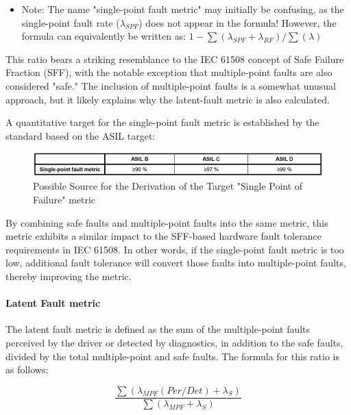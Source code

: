 \documentclass[./dissertation.tex]{subfiles}
\begin{document}
\begin{itemize}
\item Note: The name "single-point fault metric" may initially be confusing, as the single-point fault rate ($\lambda_{SPF}$) does not appear in the formula! However, the formula can equivalently be written as: $1 - \sum(\lambda_{SPF} + \lambda_{RF}) / \sum(\lambda)$
\end{itemize}

This ratio bears a striking resemblance to the IEC 61508 concept of Safe Failure Fraction (SFF), with the notable exception that multiple-point faults are also considered "safe." The inclusion of multiple-point faults is a somewhat unusual approach, but it likely explains why the latent-fault metric is also calculated.

A quantitative target for the single-point fault metric is established by the standard based on the ASIL target:

\begin{figure}[H]
\centering
\includegraphics[width=\linewidth]{subfiles/imgs/asil-t-4.png}
\caption{Possible Source for the Derivation of the Target "Single Point of Failure" metric}
\label{fig:asil-t-4}
\end{figure}

By combining safe faults and multiple-point faults into the same metric, this metric exhibits a similar impact to the SFF-based hardware fault tolerance requirements in IEC 61508. In other words, if the single-point fault metric is too low, additional fault tolerance will convert those faults into multiple-point faults, thereby improving the metric.

\paragraph{Latent Fault metric}
The latent fault metric is defined as the sum of the multiple-point faults perceived by the driver or detected by diagnostics, in addition to the safe faults, divided by the total multiple-point and safe faults. The formula for this ratio is as follows:

\begin{equation}
\frac{\sum(\lambda_{MPF}(Per/Det) + \lambda_{S})}{\sum(\lambda_{MPF} + \lambda_{S})}
\end{equation}
\end{document}
